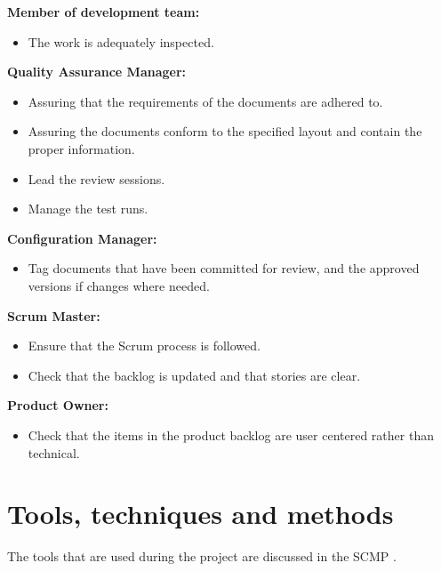 \textbf{Member of development team:}
\begin{itemize}
\item The work is adequately inspected.
\end{itemize}

\textbf{Quality Assurance Manager:}
\begin{itemize}
\item Assuring that the requirements of the documents are adhered to.
\item Assuring the documents conform to the specified layout and contain the proper information.
\item Lead the review sessions.
\item Manage the test runs.
\end{itemize}

\textbf{Configuration Manager:}
\begin{itemize}
\item Tag documents that have been committed for review, and the approved versions if changes where needed.
\end{itemize}

\textbf{Scrum Master:}
\begin{itemize}
\item Ensure that the Scrum process is followed.
\item Check that the backlog is updated and that stories are clear.
\end{itemize}

\textbf{Product Owner:}
\begin{itemize}
\item Check that the items in the product backlog are user centered rather than technical.
\end{itemize}


\section{Tools, techniques and methods}
The tools that are used during the project are discussed in the SCMP \cite{scmp}.